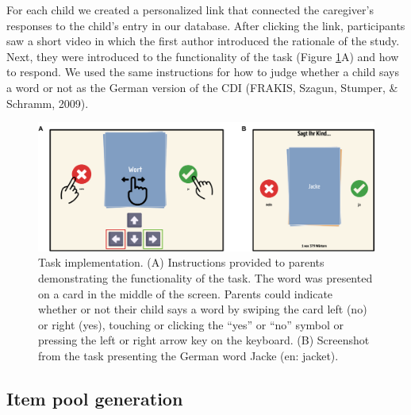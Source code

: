 \documentclass[
  man,floatsintext]{apa6}
\begin{document}
For each child we created a personalized link that connected the caregiver's responses to the child's entry in our database. After clicking the link, participants saw a short video in which the first author introduced the rationale of the study. Next, they were introduced to the functionality of the task (Figure \ref{fig:fig1}A) and how to respond. We used the same instructions for how to judge whether a child says a word or not as the German version of the CDI (FRAKIS, Szagun, Stumper, \& Schramm, 2009).



\begin{figure}

{\centering \includegraphics[width=1\linewidth]{../graphs/fig1} 

}

\caption{Task implementation. (A) Instructions provided to parents demonstrating the functionality of the task. The word was presented on a card in the middle of the screen. Parents could indicate whether or not their child says a word by swiping the card left (no) or right (yes), touching or clicking the ``yes'' or ``no'' symbol or pressing the left or right arrow key on the keyboard. (B) Screenshot from the task presenting the German word Jacke (en: jacket).}\label{fig:fig1}
\end{figure}

\hypertarget{item-pool-generation}{%
\subsection{Item pool generation}\label{item-pool-generation}}
\end{document}
